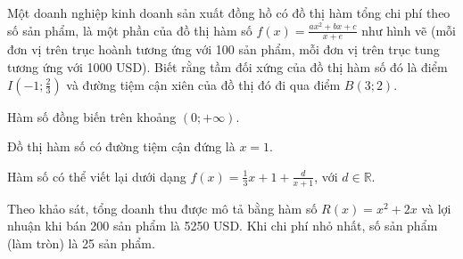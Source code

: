 \begin{question}[type=true_false,difficulty=4,code={II-4}]
Một doanh nghiệp kinh doanh sản xuất đồng hồ có đồ thị hàm tổng chi phí theo số sản phẩm, là một phần của đồ thị hàm số $ f(x)=\frac{ax^2+bx+c}{x+e} $ như hình vẽ (mỗi đơn vị trên trục hoành tương ứng với 100 sản phẩm, mỗi đơn vị trên trục tung tương ứng với 1000 USD). Biết rằng tầm đối xứng của đồ thị hàm số đó là điểm $ I\left(-1;\frac{2}{3}\right) $ và đường tiệm cận xiên của đồ thị đó đi qua điểm $ B(3;2) $.



\begin{statement}[correct=false,label=a]
Hàm số đồng biến trên khoảng $(0;+\infty)$.
\end{statement}

\begin{statement}[correct=false,label=b]
Đồ thị hàm số có đường tiệm cận đứng là $x = 1$.
\end{statement}

\begin{statement}[correct=true,label=c]
Hàm số có thể viết lại dưới dạng $f(x)=\frac{1}{3}x+1+\frac{d}{x+1}$, với $d \in \mathbb{R}$.
\end{statement}

\begin{statement}[correct=false,label=d]
Theo khảo sát, tổng doanh thu được mô tả bằng hàm số $R(x) = x^{2} + 2x$ và lợi nhuận khi bán 200 sản phẩm là 5250 USD. Khi chi phí nhỏ nhất, số sản phẩm (làm tròn) là 25 sản phẩm.
\end{statement}

\end{question}